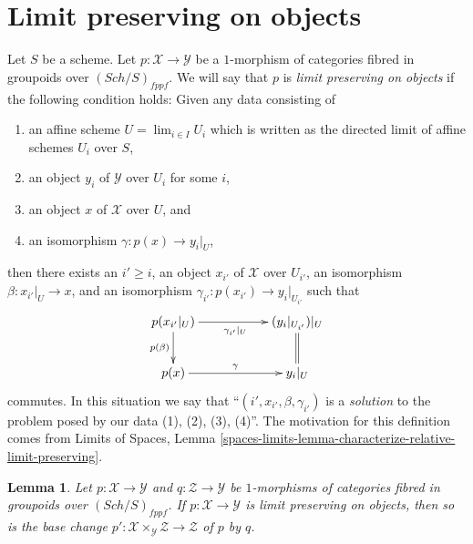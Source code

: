 \documentclass{stacks-project}
\theoremstyle{plain}
\newtheorem{lemma}[subsection]{Lemma}
\theoremstyle{definition}
\theoremstyle{remark}
\numberwithin{equation}{subsection}
\def\lim{\mathop{\mathrm{lim}}\nolimits}
\def\Sch{\mathit{Sch}}
\begin{document}
\section{Limit preserving on objects}
\label{section-limit-preserving}

\noindent
Let $S$ be a scheme. Let $p : \mathcal{X} \to \mathcal{Y}$ be a $1$-morphism
of categories fibred in groupoids over $(\Sch/S)_{fppf}$. We will say that
$p$ is {\it limit preserving on objects} if the following condition holds:
Given any data consisting of
\begin{enumerate}
\item an affine scheme $U = \lim_{i \in I} U_i$ which is written as the
directed limit of affine schemes $U_i$ over $S$,
\item an object $y_i$ of $\mathcal{Y}$ over $U_i$ for some $i$,
\item an object $x$ of $\mathcal{X}$ over $U$, and
\item an isomorphism $\gamma : p(x) \to y_i|_U$,
\end{enumerate}
then there exists an $i' \geq i$, an object $x_{i'}$ of
$\mathcal{X}$ over $U_{i'}$, an isomorphism
$\beta : x_{i'}|_U \to x$, and an isomorphism
$\gamma_{i'} : p(x_{i'}) \to y_i|_{U_{i'}}$
such that
\begin{equation}
\label{equation-limit-preserving}
\vcenter{
\xymatrix{
p(x_{i'}|_U) \ar[d]_{p(\beta)} \ar[rr]_{\gamma_{i'}|_U} & &
(y_i|_{U_{i'}})|_U \ar@{=}[d] \\
p(x) \ar[rr]^\gamma & & y_i|_U
}
}
\end{equation}
commutes. In this situation we say that ``$(i', x_{i'}, \beta, \gamma_{i'})$
is a {\it solution} to the problem posed by our data (1), (2), (3), (4)''.
The motivation for this definition comes from
Limits of Spaces,
Lemma \ref{spaces-limits-lemma-characterize-relative-limit-preserving}.

\begin{lemma}
\label{lemma-base-change-limit-preserving}
Let $p : \mathcal{X} \to \mathcal{Y}$ and $q : \mathcal{Z} \to \mathcal{Y}$
be $1$-morphisms of categories fibred in groupoids over $(\Sch/S)_{fppf}$.
If $p : \mathcal{X} \to \mathcal{Y}$ is limit preserving on objects, then so
is the base change
$p' : \mathcal{X} \times_\mathcal{Y} \mathcal{Z} \to \mathcal{Z}$
of $p$ by $q$.
\end{lemma}
\end{document}
